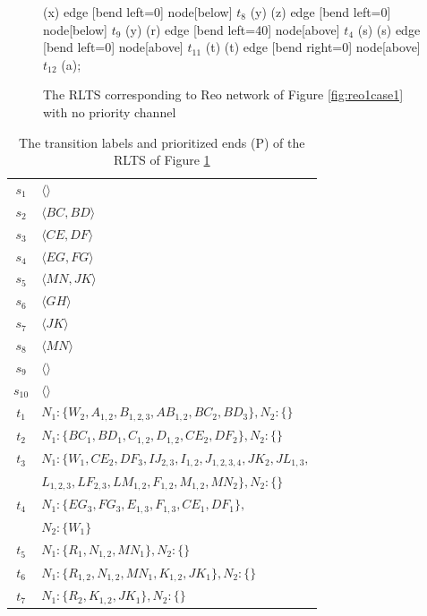 \begin{center}
\begin{figure}[t]
{          (x) edge [bend left=0] node[below] { $t_8$ } (y)
          (z) edge [bend left=0] node[below] { $t_9$ } (y)
          (r) edge [bend left=40] node[above] { $t_{4}$ } (s)
          (s) edge [bend left=0] node[above] { $t_{11}$ } (t)
          (t) edge [bend right=0] node[above] { $t_{12}$ } (a);
       }
\caption[Ignoring priorities in Figure \ref{fig:reo1case1}]{The RLTS corresponding to Reo network of Figure \ref{fig:reo1case1} with no priority channel}
\label{fig:case1behaviorwoprority}
\end{figure}
\end{center}
\begin{table}[t]
\caption[Priority data of Figure \ref{fig:case1behaviorwoprority}]{The transition labels and prioritized ends (P) of the RLTS of Figure \ref{fig:case1behaviorwoprority}
}
\begin{tabular}{|c|l|}
\hline
$s_1$ & $\langle \rangle$\\
$s_2$ & $\langle BC, BD \rangle$\\
$s_3$ & $\langle CE, DF \rangle$\\
$s_4$ & $\langle EG, FG \rangle$\\
$s_5$ & $\langle MN, JK \rangle$\\
$s_6$ & $\langle GH \rangle$\\
$s_7$ & $\langle JK \rangle$\\
$s_8$ & $\langle MN \rangle$\\
$s_9$ & $\langle \rangle $\\
$s_{10}$ & $\langle \rangle$\\
$t_1$ & $N_1:\{W_2,A_{1,2},B_{1,2,3},AB_{1,2},BC_{2},BD_{3}\},N_2:\{\}$\\
$t_2$ & $N_1:\{BC_{1},BD_{1},C_{1,2},D_{1,2},CE_{2},DF_{2}\},N_2:\{\}$\\
$t_3$ & $N_1:\{W_1,CE_{2},DF_{3},IJ_{2,3},I_{1,2},J_{1,2,3,4},JK_{2},
JL_{1,3},$\\
&$L_{1,2,3},LF_{2,3},LM_{1,2},F_{1,2},M_{1,2},MN_{2}\},N_2:\{\}$\\
$t_4$ & $N_1:\{EG_3,FG_3,E_{1,3},F_{1,3},CE_1,DF_1\},$\\
&$N_2:\{W_1\}$\\
$t_5$&$N_1:\{R_1,N_{1,2},MN_1\},N_2:\{\}$\\
$t_6$&$N_1:\{R_{1,2},N_{1,2},MN_1,K_{1,2},JK_1\},N_2:\{\}$\\
$t_7$ & $N_1:\{R_2,K_{1,2},JK_1\},N_2:\{\}$\\

\end{tabular}
\end{table}
